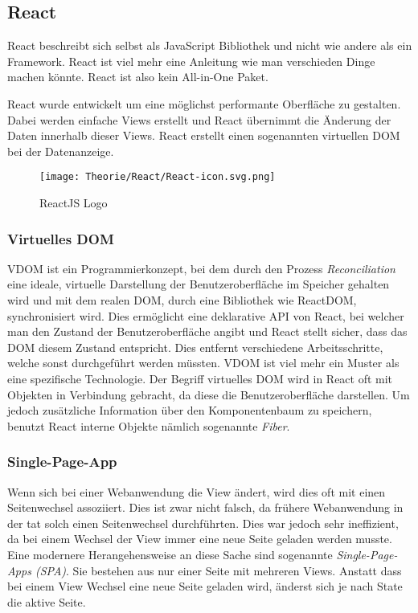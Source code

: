 \subsection{React}
\label{reactjs}
React beschreibt sich selbst als JavaScript Bibliothek und nicht wie andere als 
ein Framework. React ist viel mehr eine Anleitung wie man verschieden Dinge machen könnte.
React ist also kein All-in-One Paket.


React wurde entwickelt um eine möglichst performante Oberfläche zu gestalten. Dabei werden 
einfache Views erstellt und React übernimmt die Änderung der Daten innerhalb dieser Views. React 
erstellt einen sogenannten virtuellen DOM bei der Datenanzeige.

\begin{figure}[H]
  \begin{center}
    \texttt{[image: Theorie/React/React-icon.svg.png]}
    \caption{ReactJS Logo~\cite{reactjs}}
  \end{center}
\end{figure}

\newpage
\subsubsection{Virtuelles DOM}
VDOM ist ein Programmierkonzept, bei dem durch den Prozess \textit{Reconciliation} eine ideale, 
virtuelle Darstellung der Benutzeroberfläche im Speicher gehalten wird und mit dem realen DOM, durch 
eine Bibliothek wie ReactDOM, synchronisiert wird. Dies ermöglicht eine deklarative API von React, 
bei welcher man den Zustand der Benutzeroberfläche angibt und React stellt sicher, dass das DOM diesem 
Zustand entspricht. Dies entfernt verschiedene Arbeitsschritte, welche sonst durchgeführt werden müssten.
VDOM ist viel mehr ein Muster als eine spezifische Technologie. Der Begriff virtuelles DOM wird in 
React oft mit Objekten in Verbindung gebracht, da diese die Benutzeroberfläche darstellen. Um jedoch 
zusätzliche Information über den Komponentenbaum zu speichern, benutzt React interne 
Objekte nämlich sogenannte \textit{Fiber}.\cite{DOM}

\subsubsection{Single-Page-App}
\label{singlePageApp}
Wenn sich bei einer Webanwendung die View ändert, wird dies oft mit einen Seitenwechsel 
assoziiert. Dies ist zwar nicht falsch, da frühere Webanwendung in der tat solch einen Seitenwechsel 
durchführten. Dies war jedoch sehr ineffizient, da bei einem Wechsel der View immer eine neue Seite 
geladen werden musste. Eine modernere Herangehensweise an diese Sache sind sogenannte
\textit{Single-Page-Apps (SPA)}. Sie bestehen aus nur einer Seite mit mehreren Views. Anstatt dass 
bei einem View Wechsel eine neue Seite geladen wird, änderst sich je nach State die aktive Seite.
~\cite{SPA}


